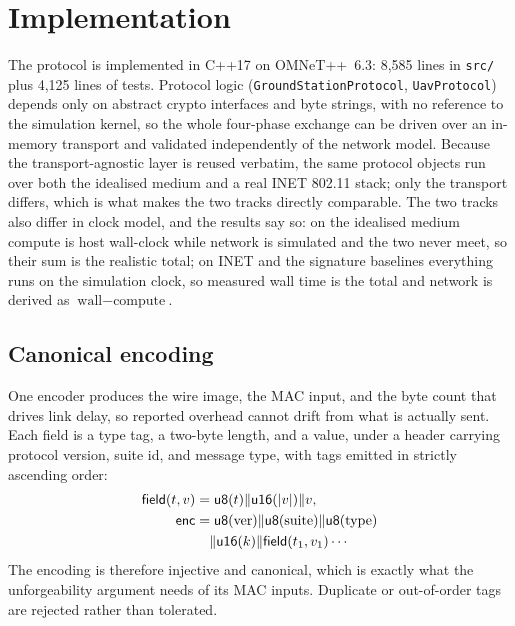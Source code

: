 \documentclass[conference]{IEEEtran}
\begin{document}
\section{Implementation}
\label{sec:impl}

The protocol is implemented in C++17 on OMNeT++~6.3: 8{,}585 lines in
\texttt{src/} plus 4{,}125 lines of tests. Protocol logic
(\texttt{GroundStationProtocol}, \texttt{UavProtocol}) depends only on abstract
crypto interfaces and byte strings, with no reference to the simulation kernel,
so the whole four-phase exchange can be driven over an in-memory transport and
validated independently of the network model. Because the transport-agnostic
layer is reused verbatim, the same protocol objects run over both the idealised
medium and a real INET 802.11 stack; only the transport differs, which is what
makes the two tracks directly comparable. The two tracks also differ in clock
model, and the results say so: on the idealised medium compute is host
wall-clock while network is simulated and the two never meet, so their sum is the
realistic total; on INET and the signature baselines everything runs on the
simulation clock, so measured wall time is the total and network is derived as
$\text{wall}-\text{compute}$.

\subsection{Canonical encoding}

One encoder produces the wire image, the MAC input, and the byte count that
drives link delay, so reported overhead cannot drift from what is actually
sent. Each field is a type tag, a two-byte length, and a value, under a header
carrying protocol version, suite id, and message type, with tags emitted in
strictly ascending order:
\begin{align}
\mathsf{field}(t,v) &= \mathsf{u8}(t) \| \mathsf{u16}(|v|) \| v,\\
\mathsf{enc} &= \mathsf{u8}(\text{ver}) \| \mathsf{u8}(\text{suite}) \| \mathsf{u8}(\text{type}) \notag\\
             &\quad \| \mathsf{u16}(k) \| \mathsf{field}(t_1,v_1)\cdots
\end{align}
The encoding is therefore injective and canonical, which is exactly what the
unforgeability argument needs of its MAC inputs. Duplicate or out-of-order tags
are rejected rather than tolerated.
\end{document}

